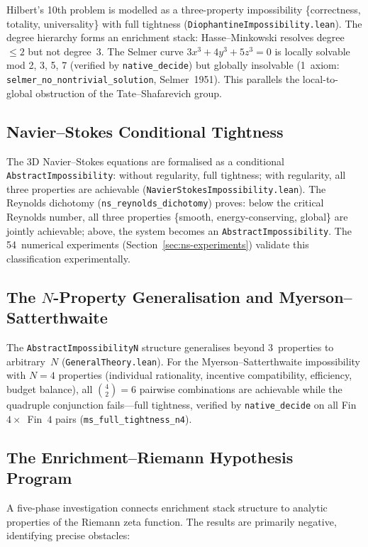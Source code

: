 \documentclass[11pt,a4paper]{article}
\begin{document}
Hilbert's 10th problem is modelled as a three-property impossibility \{correctness, totality, universality\} with full tightness (\texttt{DiophantineImpossibility.lean}).  The degree hierarchy forms an enrichment stack: Hasse--Minkowski resolves degree~$\leq 2$ but not degree~3.  The Selmer curve $3x^3 + 4y^3 + 5z^3 = 0$ is locally solvable mod 2, 3, 5, 7 (verified by \texttt{native\_decide}) but globally insolvable (1~axiom: \texttt{selmer\_no\_nontrivial\_solution}, Selmer~1951).  This parallels the local-to-global obstruction of the Tate--Shafarevich group.

\subsection{Navier--Stokes Conditional Tightness}

The 3D Navier--Stokes equations are formalised as a conditional \texttt{AbstractImpossibility}: without regularity, full tightness; with regularity, all three properties are achievable (\texttt{NavierStokesImpossibility.lean}).  The Reynolds dichotomy (\texttt{ns\_reynolds\_dichotomy}) proves: below the critical Reynolds number, all three properties \{smooth, energy-conserving, global\} are jointly achievable; above, the system becomes an \texttt{AbstractImpossibility}.  The 54~numerical experiments (Section~\ref{sec:ns-experiments}) validate this classification experimentally.

\subsection{The $N$-Property Generalisation and Myerson--Satterthwaite}

The \texttt{AbstractImpossibilityN} structure generalises beyond 3~properties to arbitrary~$N$ (\texttt{GeneralTheory.lean}).  For the Myerson--Satterthwaite impossibility with $N = 4$ properties (individual rationality, incentive compatibility, efficiency, budget balance), all $\binom{4}{2} = 6$ pairwise combinations are achievable while the quadruple conjunction fails---full tightness, verified by \texttt{native\_decide} on all Fin~$4 \times$~Fin~$4$ pairs (\texttt{ms\_full\_tightness\_n4}).

\subsection{The Enrichment--Riemann Hypothesis Program}

A five-phase investigation connects enrichment stack structure to analytic properties of the Riemann zeta function.  The results are primarily negative, identifying precise obstacles:
\end{document}
